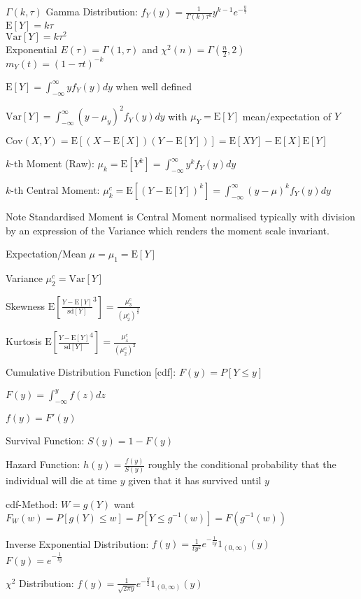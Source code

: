 $\Gamma (k,\tau)$ Gamma Distribution: $f_Y(y)=\frac{1}{\Gamma (k) \tau^k} y^{k-1} e^{-\frac{y}{\tau}}$ \\
$\text{E}[Y]=k\tau$ \\
$\text{Var}[Y]=k\tau^2$ \\
Exponential $E(\tau)=\Gamma (1,\tau)$ and $\chi^2 (n)=\Gamma (\frac{n}{2},2)$ \\
$m_Y(t)=(1-\tau t)^{-k}$

$\text{E}[Y]=\int_{-\infty}^{\infty} yf_Y(y)dy$ when well defined

$\text{Var}[Y]=\int_{-\infty}^{\infty} (y-\mu_y)^2f_Y(y)dy$ with $\mu_Y=\text{E}[Y]$ mean/expectation of $Y$

$\text{Cov}(X,Y)=\text{E}[(X-\text{E}[X])(Y-\text{E}[Y])]=\text{E}[XY]-\text{E}[X]\text{E}[Y]$

$k$-th Moment (Raw): $\mu_k=\text{E}[Y^k]=\int_{-\infty}^{\infty}y^kf_Y(y)dy$

$k$-th Central Moment: $\mu_k^c=\text{E}[(Y-\text{E}[Y])^k]=\int_{-\infty}^{\infty}(y-\mu)^kf_Y(y)dy$

Note Standardised Moment is Central Moment normalised typically with division by an expression of the Variance which renders the moment scale invariant.

Expectation/Mean $\mu=\mu_1=\text{E}[Y]$

Variance $\mu_2^c=\text{Var}[Y]$

Skewness $\text{E}\left[ \frac{Y-\text{E}[Y]}{\text{sd}[Y]}^3 \right]=\frac{\mu_3^c}{(\mu_2^c)^{\frac{3}{2}}}$

Kurtosis $\text{E}\left[ \frac{Y-\text{E}[Y]}{\text{sd}[Y]}^4 \right]=\frac{\mu_4^c}{(\mu_2^c)^2}$

Cumulative Distribution Function [cdf]: $F(y)=P[Y\le y]$

$F(y)=\int_{-\infty}^y f(z)dz$

$f(y)=F'(y)$

Survival Function: $S(y)=1-F(y)$

Hazard Function: $h(y)=\frac{f(y)}{S(y)}$ roughly the conditional probability that the individual will die at time $y$ given that it has survived until $y$

cdf-Method: $W=g(Y)$ want $F_W(w)=P[g(Y)\le w]=P[Y\le g^{-1}(w)]=F(g^{-1}(w))$

Inverse Exponential Distribution: $f(y)=\frac{1}{ty^2}e^{-\frac{1}{ty}}1_{(0,\infty)}(y)$ \\
$F(y)=e^{-\frac{1}{ty}}$

$\chi^2$ Distribution: $f(y)=\frac{1}{\sqrt{2\pi y}}e^{-\frac{y}{2}}1_{(0,\infty)}(y)$

